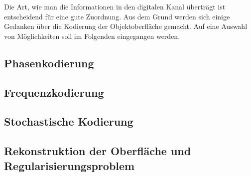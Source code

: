 \noindent
Die Art, wie man die Informationen in den digitalen Kanal überträgt ist entscheidend für eine gute Zuordnung.
Aus dem Grund werden sich einige Gedanken über die Kodierung der Objektoberfläche gemacht.
Auf eine Auswahl von Möglichkeiten soll im Folgenden eingegangen werden.
%
{
	\FloatBarrier
    \subsection{Phasenkodierung}
    \label{sub:phasenKodierung}
    
}
%
{
	\FloatBarrier
    \subsection{Frequenzkodierung}
    \label{sub:frequenzKodierung}
    
}
%
{
	\FloatBarrier
    \subsection{Stochastische Kodierung}
    \label{sub:stochastischeKodierung}
    
}
%
{
	\FloatBarrier
    \subsection{Rekonstruktion der Oberfläche und Regularisierungsproblem}
    \label{sub:rekonstruktionUndRegularisierungsproblem}
    
}
%
